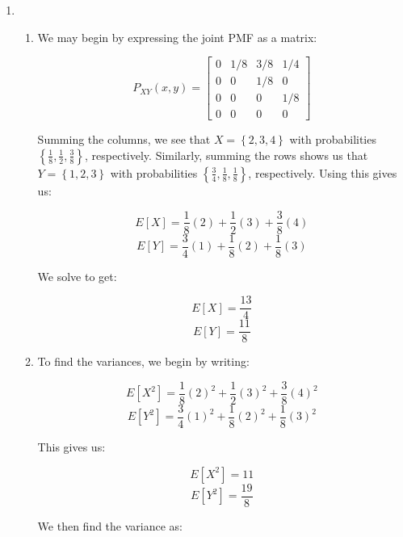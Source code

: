 \begin{enumerate}
    \begin{enumerate}

      \item 

      \item 

      \item 

      \item 

      \item 

    \end{enumerate}

  \item

    \begin{enumerate}

      \item We may begin by expressing the joint PMF as a matrix:

        $$P_{XY}(x,y)=\left[ \begin{matrix} 0 & 1/8 & 3/8 & 1/4\\ 0 & 0 & 1/8 & 0\\ 0 & 0 & 0 & 1/8\\ 0 & 0 & 0 & 0\end{matrix} \right]$$

        Summing the columns, we see that $X=\left\{ 2,3,4 \right\}$ with probabilities $\left\{ \frac{1}{8}, \frac{1}{2}, \frac{3}{8} \right\}$, respectively. Similarly, summing the rows shows us that $Y=\left\{ 1,2,3 \right\}$  with probabilities $\left\{ \frac{3}{4}, \frac{1}{8}, \frac{1}{8} \right\}$, respectively. Using this gives us:

        $$E[X]=\frac{1}{8}(2)+\frac{1}{2}(3)+\frac{3}{8}(4)$$
        $$E[Y]=\frac{3}{4}(1)+\frac{1}{8}(2)+\frac{1}{8}(3)$$

        We solve to get:

        $$\boxed{E[X]=\frac{13}{4}}$$
        $$\boxed{E[Y]=\frac{11}{8}}$$

      \item To find the variances, we begin by writing:

        $$E[X^2]=\frac{1}{8}(2)^2+\frac{1}{2}(3)^2+\frac{3}{8}(4)^2$$
        $$E[Y^2]=\frac{3}{4}(1)^2+\frac{1}{8}(2)^2+\frac{1}{8}(3)^2$$

        This gives us:

        $$E[X^2]=11$$
        $$E[Y^2]=\frac{19}{8}$$

        We then find the variance as:


\end{enumerate}
\end{enumerate}
